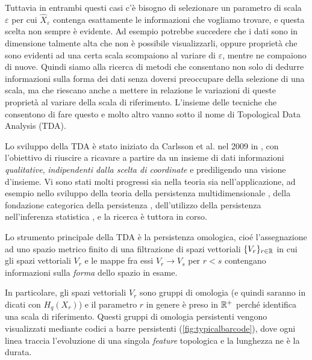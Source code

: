 Tuttavia in entrambi questi casi c'è bisogno di selezionare un parametro di scala $\varepsilon$ per cui $\widehat{X}_\varepsilon$ contenga esattamente le informazioni che vogliamo trovare, e questa scelta non sempre è evidente. Ad esempio potrebbe succedere che i dati sono in dimensione talmente alta che non è possibile visualizzarli, oppure proprietà che sono evidenti ad una certa scala scompaiono al variare di $\varepsilon$, mentre ne compaiono di nuove. Quindi siamo alla ricerca di metodi che consentano non solo di dedurre informazioni sulla forma dei dati senza doversi preoccupare della selezione di una scala, ma che riescano anche a mettere in relazione le variazioni di queste proprietà al variare della scala di riferimento. L'insieme delle tecniche che consentono di fare questo e molto altro vanno sotto il nome di Topological Data Analysis (TDA).

Lo sviluppo della TDA è stato iniziato da Carlsson et al. nel 2009 in \cite{Carlsson2009}, con l'obiettivo di riuscire a ricavare a partire da un insieme di dati informazioni \emph{qualitative}, \emph{indipendenti dalla scelta di coordinate} e prediligendo una visione d'insieme. Vi sono stati molti progressi sia nella teoria sia nell'applicazione, ad esempio nello sviluppo della teoria della persistenza multidimensionale \cite{Cerri2013,Carlsson2009a,Adcock2012,Carlsson2009b}, della fondazione categorica della persistenza
\cite{Curry}, dell'utilizzo della persistenza nell'inferenza statistica \cite{Bubenik2015,Kwitt2015}, e la ricerca è tuttora in corso.

Lo strumento principale della TDA è la persistenza omologica, cioé l'assegnazione ad uno spazio metrico finito di una filtrazione di spazi vettoriali $\{V_r\}_{r\in\mathbb{R}}$ in cui gli spazi vettoriali $V_r$ e le mappe fra essi $V_r\to V_s$ per $r<s$ contengano informazioni sulla \emph{forma} dello spazio in esame.

In particolare, gli spazi vettoriali $V_r$ sono gruppi di omologia (e quindi saranno in dicati con $H_q(X_r)$) e il parametro $r$ in genere è preso in $\mathbb{R}^+$ perché identifica una scala di riferimento. Questi gruppi di omologia persistenti vengono visualizzati mediante codici a barre persistenti (\cref{fig:typicalbarcode}), dove ogni linea traccia l'evoluzione di una singola \emph{feature} topologica e la lunghezza ne è la durata.


